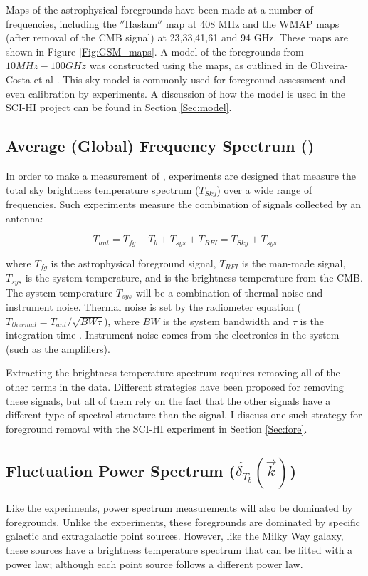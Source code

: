 Maps of the astrophysical foregrounds have been made at a number of frequencies, including the $''$Haslam$''$ map at 408 MHz and the WMAP maps (after removal of the CMB signal) at 23,33,41,61 and 94 GHz. These maps are shown in Figure \ref{Fig:GSM_maps}. A model of the foregrounds from $10 MHz-100 GHz$ was constructed using the maps, as outlined in de Oliveira-Costa et al \cite{GSM_model}. This sky model is commonly used for foreground assessment and even calibration by \cm experiments. A discussion of how the model is used in the SCI-HI project can be found in Section \ref{Sec:model}. 

\subsection{Average (Global) Frequency Spectrum (\avgdtb)}
In order to make a measurement of \avgdtb, experiments are designed that measure the total sky brightness temperature spectrum ($T_{Sky}$) over a wide range of frequencies. Such experiments measure the combination of signals collected by an antenna:

\begin{equation}
T_{ant} = T_{fg} + T_b +T_{sys}+T_{RFI} = T_{Sky} + T_{sys}
\end{equation}

where $T_{fg}$ is the astrophysical foreground signal, $T_{RFI}$ is the man-made signal, $T_{sys}$ is the system temperature, and \tb is the brightness temperature from the CMB. The system temperature $T_{sys}$ will be a combination of thermal noise and instrument noise. Thermal noise is set by the radiometer equation ($T_{thermal} = T_{ant}/\sqrt{BW \tau}$), where $BW$ is the system bandwidth and $\tau$ is the integration time \cite{carroll2007}. Instrument noise comes from the electronics in the system (such as the amplifiers). 

Extracting the \cm brightness temperature spectrum requires removing all of the other terms in the data. Different strategies have been proposed for removing these signals, but all of them rely on the fact that the other signals have a different type of spectral structure than the \cm signal. I discuss one such strategy for foreground removal with the SCI-HI experiment in Section \ref{Sec:fore}. 

\subsection{Fluctuation Power Spectrum ($ \tilde{ \delta_{T_b} } ( \vec{k} )$)}
Like the \avgdtb experiments, power spectrum measurements will also be dominated by foregrounds. Unlike the \avgdtb experiments, these foregrounds are dominated by specific galactic and extragalactic point sources. However, like the Milky Way galaxy, these sources have a brightness temperature spectrum that can be fitted with a power law; although each point source follows a different power law. 

